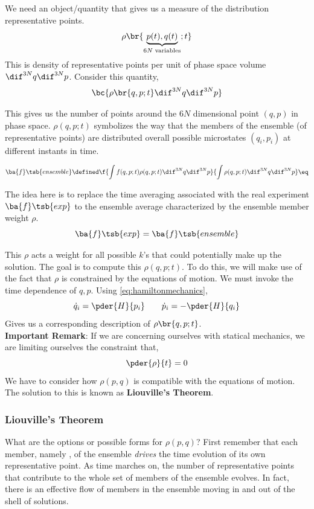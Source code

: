\documentclass{article}
\begin{document}
We need an object/quantity that gives us a measure of the distribution representative points.
\[ \rho \br{\underbrace{p(t), q(t)}_{6N \text{ variables}}; t} \]
This is density of representative points per unit of phase space volume $\dif^{3N} q \dif^{3N} p$. Consider this quantity,
\[ \bc{\rho \br{q,p;t} \dif^{3N} q \dif^{3N} p} \]

This gives us the number of points around the $6N$ dimensional point $(q,p)$ in phase space. $\rho(q,p;t)$ symbolizes the way that the members of the ensemble (of representative points) are distributed overall possible microstates $(q_i, p_i)$ at different instants in time.

\[ \ba{f}\tsb{ensemble} \defined \f{\int f(q,p;t) \rho(q,p;t) \dif^{3N}q\dif^{3N}p}{\int\rho(q,p;t) \dif^{3N}q\dif^{3N}p} \eq \label{eq:fensemble} \]

The idea here is to replace the time averaging associated with the real experiment $\ba{f}\tsb{exp}$ to the ensemble average characterized by the ensemble member weight $\rho$.
\[ \ba{f}\tsb{exp} = \ba{f}\tsb{ensemble} \]

This $\rho$ acts a weight for all possible $k$'s that could potentially make up the solution. The goal is to compute this $\rho(q,p;t)$. To do this, we will make use of the fact that $\rho$ is constrained by the equations of motion. We must invoke the time dependence of $q,p$. Using \eqref{eq:hamiltonmechanics},
\[ \dot{q}_i = \pder{H}{p_i} \qquad \dot{p}_i = -\pder{H}{q_i} \]
Gives us a corresponding description of $\rho\br{q,p;t}$. \\

\textbf{Important Remark}: If we are concerning ourselves with statical mechanics, we are limiting ourselves the constraint that,
\[ \pder{\rho}{t} = 0 \]
We have to consider how $\rho(p,q)$ is compatible with the equations of motion. The solution to this is known as \textbf{Liouville's Theorem}.

\subsubsection{Liouville's Theorem}
What are the options or possible forms for $\rho(p, q)$? First remember that each member, namely , of the ensemble \textit{drives} the time evolution of its own representative point. As time marches on, the number of representative points that contribute to the whole set of members of the ensemble evolves. In fact, there is an effective flow of members in the ensemble moving in and out of the shell of solutions.
\end{document}
